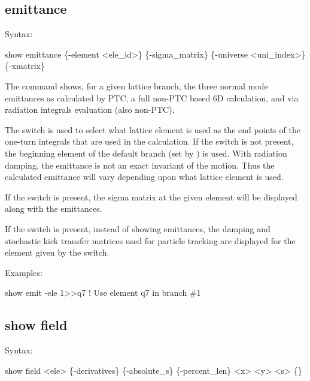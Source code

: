 {{{{{{{{{%

\subsection{emittance}
\label{s:show.emit}

Syntax:
\begin{example}
  show emittance \{-element <ele_id>\} \{-sigma_matrix\} \{-universe <uni_index>\} \{-xmatrix\} 
\end{example}

The  command shows, for a given lattice branch, the three normal mode emittances
as calculated by PTC, a full non-PTC based 6D calculation, and via radiation integrals evaluation
(also non-PTC).

The  switch is used to select what lattice element is used as the end points of the
one-turn integrals that are used in the calculation. If the  switch is not present, the
beginning element of the default branch (set by ) is used. With radiation
damping, the emittance is not an exact invariant of the motion. Thus the calculated emittance will
vary depending upon what lattice element is used.

If the  switch is present, the sigma matrix at the given element will be displayed
along with the emittances.

If the  switch is present, instead of showing emittances, the damping and stochastic
kick transfer matrices used for particle tracking are displayed for the element given by the
 switch.

Examples:
\begin{example}
  show emit -ele 1>>q7  ! Use element q7 in branch \#1
\end{example}


\subsection{show field}
\label{s:show.field}

Syntax:
\begin{example}
  show field <ele> \{-derivatives\} \{-absolute_s\} \{-percent_len\} <x> <y> <s> \{<t-or-z>\}
\end{example}

}}}}}}}}}
